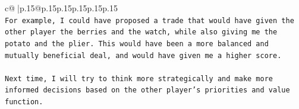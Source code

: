 \documentclass{article}
\begin{document}
{\begin{supertabular}{c@{$\;$}|p{.15\linewidth}@{}p{.15\linewidth}p{.15\linewidth}p{.15\linewidth}p{.15\linewidth}p{.15\linewidth}}
{{{\\ 
\texttt{For example, I could have proposed a trade that would have given the other player the berries and the watch, while also giving me the potato and the plier. This would have been a more balanced and mutually beneficial deal, and would have given me a higher score. } \\
\\ 
\texttt{Next time, I will try to think more strategically and make more informed decisions based on the other player's priorities and value function.} \\
            }
        }
    }
     \\ \\

\end{supertabular}
}
\end{document}
